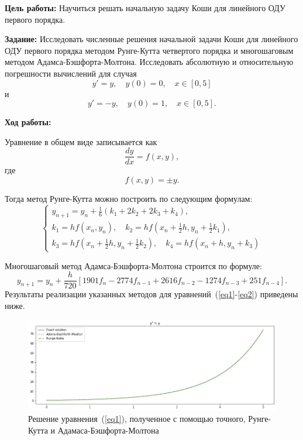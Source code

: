 \justifying
\textbf{Цель работы:}
Научиться решать начальную задачу Коши для линейного ОДУ первого порядка.

\textbf{Задание:}
Исследовать численные решения начальной задачи Коши для линейного ОДУ первого порядка методом Рунге-Кутта четвертого порядка и многошаговым методом Адамса-Бэшфорта-Молтона. Исследовать абсолютную и относительную погрешности вычислений для случая
\begin{equation}\label{eq1}
    y' = y, \quad y(0) = 0, \quad x \in [0, 5]
\end{equation}
и
\begin{equation}\label{eq2}
    y' = -y, \quad y(0) = 1, \quad x \in [0, 5].
\end{equation}

\textbf{Ход работы:}

Уравнение в общем виде записывается как
\begin{equation}
    \frac{dy}{dx} = f(x,y),
\end{equation}
где
\begin{equation}
    f(x,y) = \pm y.
\end{equation}

Тогда метод Рунге-Кутта можно построить по следующим формулам:
\begin{equation}
\begin{cases}
    y_{n+1}=y_n+\frac{1}{6}(k_1+2k_2+2k_3+k_4), \\
    k_1=hf(x_n,y_n), \quad k_2=hf(x_n+\frac{1}{2} h, y_n+\frac{1}{2} k_1),\\
    k_3=hf(x_n+\frac{1}{2}h,y_n+\frac{1}{2}k_2), \quad k_4=hf(x_n+h,y_n+k_3)
\end{cases}
\end{equation}

Многошаговый метод Адамса-Бэшфорта-Молтона строится по формуле:
\begin{equation}
    y_{n+1}=y_n+\frac{h}{720}[1901f_{n}-2774f_{n-1}+2616f_{n-2}-1274f_{n-3}+251f_{n-4}].
\end{equation}
\newpage
Результаты реализации указанных методов для уравнений~(\ref{eq1}-\ref{eq2}) приведены ниже.
\begin{figure}[ht!]
    \centering
    \includegraphics[width=\linewidth]{Figures/res1.png}
    \caption{Решение уравнения~(\ref{eq1}), полученное с помощью точного, Рунге-Кутта и Адамаса-Бэшфорта-Молтона}
    \label{fig:my_label}
\end{figure}

